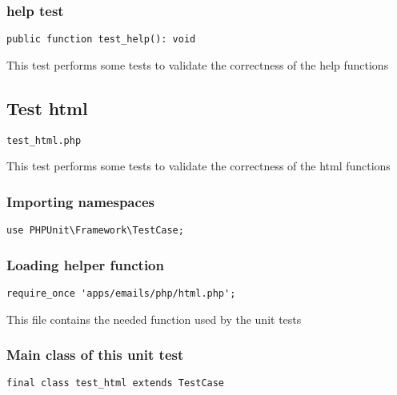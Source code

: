 \documentclass[a4paper]{article}
\begin{document}
\hypertarget{toc207}{}
\subsubsection{help test}

\begin{lstlisting}
public function test_help(): void
\end{lstlisting}

This test performs some tests to validate the correctness
of the help functions

\hypertarget{toc208}{}
\subsection{Test html}

\begin{lstlisting}
test_html.php
\end{lstlisting}

This test performs some tests to validate the correctness
of the html functions

\hypertarget{toc209}{}
\subsubsection{Importing namespaces}

\begin{lstlisting}
use PHPUnit\Framework\TestCase;
\end{lstlisting}

\hypertarget{toc210}{}
\subsubsection{Loading helper function}

\begin{lstlisting}
require_once 'apps/emails/php/html.php';
\end{lstlisting}

This file contains the needed function used by the unit tests

\hypertarget{toc211}{}
\subsubsection{Main class of this unit test}

\begin{lstlisting}
final class test_html extends TestCase
\end{lstlisting}

\hypertarget{toc212}{}
\end{document}
